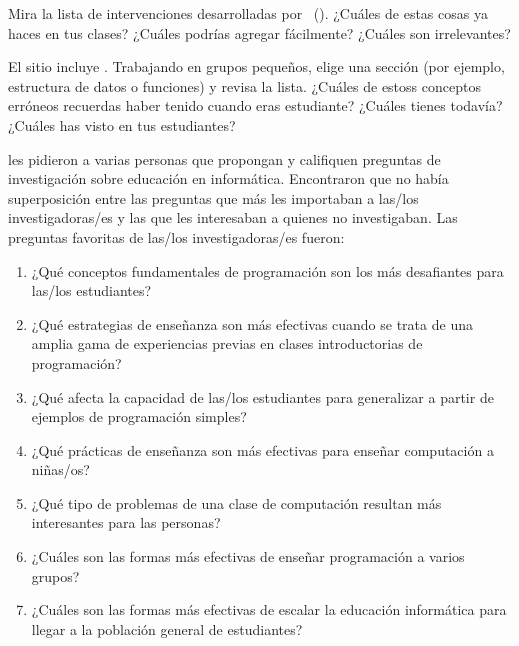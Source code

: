 
Mira la lista de intervenciones desarrolladas por~\cite{Viha2014} ().
¿Cuáles de estas cosas ya haces en tus clases?
¿Cuáles podrías agregar fácilmente?
¿Cuáles son irrelevantes?


El sitio 
incluye .
Trabajando en grupos pequeños,
elige una sección (por ejemplo, estructura de datos o funciones) y revisa la lista.
¿Cuáles de estoss conceptos erróneos recuerdas haber tenido cuando eras estudiante?
¿Cuáles tienes todavía?
¿Cuáles has visto en tus estudiantes?


\cite{Denn2019} les pidieron a varias personas que propongan y califiquen preguntas de investigación sobre educación en informática.
Encontraron que no había superposición entre las preguntas que más les importaban a las/los investigadoras/es
y las que les interesaban a quienes no investigaban.
Las preguntas favoritas de las/los investigadoras/es fueron:

\begin{enumerate}

\item                              
  ¿Qué conceptos fundamentales de programación son los más desafiantes para las/los estudiantes?

\item
  ¿Qué estrategias de enseñanza son más efectivas cuando se trata de una amplia gama de experiencias previas en clases introductorias de programación?

\item
  ¿Qué afecta la capacidad de las/los estudiantes para generalizar a partir de ejemplos de programación simples?

\item
  ¿Qué prácticas de enseñanza son más efectivas para enseñar computación a niñas/os?

\item
  ¿Qué tipo de problemas de una clase de computación resultan más interesantes para las personas?    

\item
  ¿Cuáles son las formas más efectivas de enseñar programación a varios grupos?

\item
  ¿Cuáles son las formas más efectivas de escalar la educación informática para llegar a la población general de estudiantes?

\end{enumerate}

